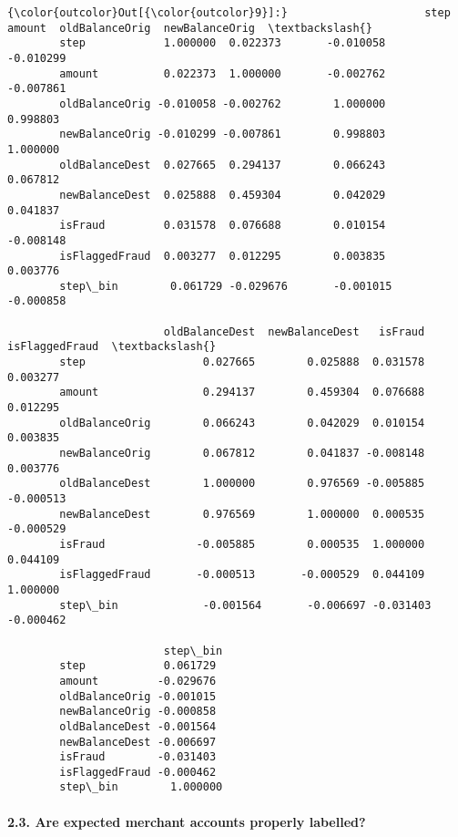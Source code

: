 \documentclass[11pt]{article}
\begin{document}
\begin{Verbatim}[commandchars=\\\{\}]
{\color{outcolor}Out[{\color{outcolor}9}]:}                     step    amount  oldBalanceOrig  newBalanceOrig  \textbackslash{}
        step            1.000000  0.022373       -0.010058       -0.010299   
        amount          0.022373  1.000000       -0.002762       -0.007861   
        oldBalanceOrig -0.010058 -0.002762        1.000000        0.998803   
        newBalanceOrig -0.010299 -0.007861        0.998803        1.000000   
        oldBalanceDest  0.027665  0.294137        0.066243        0.067812   
        newBalanceDest  0.025888  0.459304        0.042029        0.041837   
        isFraud         0.031578  0.076688        0.010154       -0.008148   
        isFlaggedFraud  0.003277  0.012295        0.003835        0.003776   
        step\_bin        0.061729 -0.029676       -0.001015       -0.000858   
        
                        oldBalanceDest  newBalanceDest   isFraud  isFlaggedFraud  \textbackslash{}
        step                  0.027665        0.025888  0.031578        0.003277   
        amount                0.294137        0.459304  0.076688        0.012295   
        oldBalanceOrig        0.066243        0.042029  0.010154        0.003835   
        newBalanceOrig        0.067812        0.041837 -0.008148        0.003776   
        oldBalanceDest        1.000000        0.976569 -0.005885       -0.000513   
        newBalanceDest        0.976569        1.000000  0.000535       -0.000529   
        isFraud              -0.005885        0.000535  1.000000        0.044109   
        isFlaggedFraud       -0.000513       -0.000529  0.044109        1.000000   
        step\_bin             -0.001564       -0.006697 -0.031403       -0.000462   
        
                        step\_bin  
        step            0.061729  
        amount         -0.029676  
        oldBalanceOrig -0.001015  
        newBalanceOrig -0.000858  
        oldBalanceDest -0.001564  
        newBalanceDest -0.006697  
        isFraud        -0.031403  
        isFlaggedFraud -0.000462  
        step\_bin        1.000000  
\end{Verbatim}
            
    \paragraph{2.3. Are expected merchant accounts properly
labelled?}\label{are-expected-merchant-accounts-properly-labelled}
\end{document}

